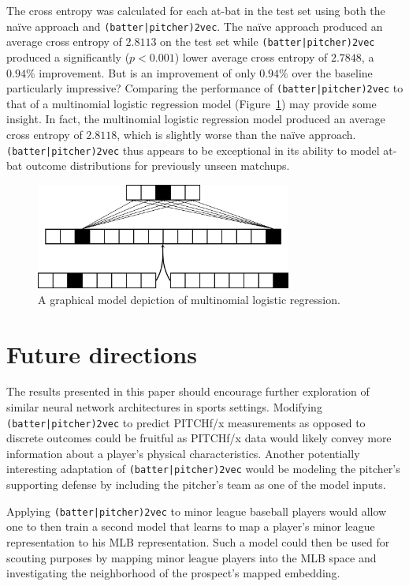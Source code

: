 \documentclass{article}
\begin{document}
The cross entropy was calculated for each at-bat in the test set using both the naïve approach and \texttt{(batter|pitcher)2vec}. The naïve approach produced an average cross entropy of $2.8113$ on the test set while \texttt{(batter|pitcher)2vec} produced a significantly ($p < 0.001$) lower average cross entropy of $2.7848$, a $0.94\%$ improvement. But is an improvement of only $0.94\%$ over the baseline particularly impressive? Comparing the performance of \texttt{(batter|pitcher)2vec} to that of a multinomial logistic regression model (Figure~\ref{fig:log_reg}) may provide some insight. In fact, the multinomial logistic regression model produced an average cross entropy of $2.8118$, which is slightly worse than the naïve approach. \texttt{(batter|pitcher)2vec} thus appears to be exceptional in its ability to model at-bat outcome distributions for previously unseen matchups.

\begin{figure}[h]
\centering
\includegraphics[width=0.75\textwidth,height=\textheight,keepaspectratio]{logistic_regression.png}
\caption{A graphical model depiction of multinomial logistic regression.}
\label{fig:log_reg}
\end{figure}

\section{Future directions}
\label{future}

The results presented in this paper should encourage further exploration of similar neural network architectures in sports settings. Modifying \texttt{(batter|pitcher)2vec} to predict PITCHf/x measurements as opposed to discrete outcomes could be fruitful as PITCHf/x data would likely convey more information about a player's physical characteristics. Another potentially interesting adaptation of \texttt{(batter|pitcher)2vec} would be modeling the pitcher's supporting defense by including the pitcher's team as one of the model inputs.

Applying \texttt{(batter|pitcher)2vec} to minor league baseball players would allow one to then train a second model that learns to map a player's minor league representation to his MLB representation. Such a model could then be used for scouting purposes by mapping minor league players into the MLB space and investigating the neighborhood of the prospect's mapped embedding.
\end{document}
